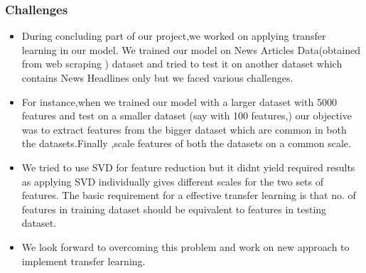 \documentclass{beamer}
\newcommand\tab[1][1cm]{\hspace*{#1}}
\begin{document}
\begin{frame}
\frametitle{\tab \tab \tab \quad \quad \quad \huge Challenges}
\begin{itemize}
\item During concluding part of our project,we worked on applying transfer learning in our model. We trained our model on News Articles Data(obtained from web scraping ) dataset and tried to test it on another dataset which contains News Headlines only but we faced various challenges. \\
\item For instance,when we trained our model with a larger dataset with 5000 features and test on a smaller dataset (say with 100 features,) our objective was to extract features from the bigger dataset which are common in both the datasets.Finally ,scale features of both the datasets on a common scale. \\
\item We tried to use SVD for feature reduction but it didn\textquotesingle t yield required results as applying SVD individually gives different scales for the two sets of
features. The basic requirement for a effective transfer learning is that no. of
features in training dataset should be equivalent to features in testing dataset.\\
\item We look forward to overcoming this problem and work on new approach to implement transfer learning.
\end{itemize}
\end {frame}
\end{document}
